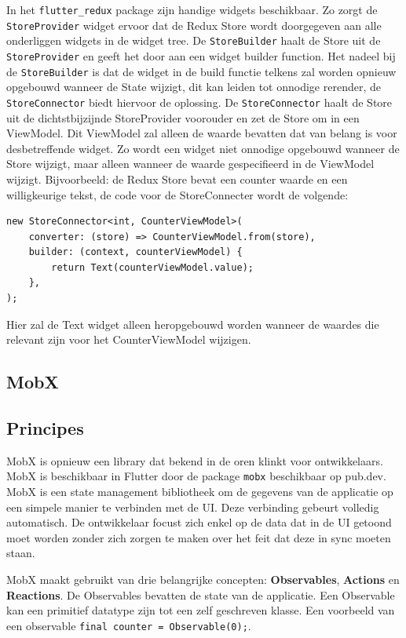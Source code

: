 In het \verb|flutter_redux| package zijn handige widgets beschikbaar. Zo zorgt de \verb|StoreProvider| widget ervoor dat de Redux Store wordt doorgegeven aan alle onderliggen widgets in de widget tree. De \verb|StoreBuilder| haalt de Store uit de \verb|StoreProvider| en geeft het door aan een widget builder function. Het nadeel bij de \verb|StoreBuilder| is dat de widget in de build functie telkens zal worden opnieuw opgebouwd wanneer de State wijzigt, dit kan leiden tot onnodige rerender, de \verb|StoreConnector| biedt hiervoor de oplossing. De \verb|StoreConnector| haalt de Store uit de dichtstbijzijnde StoreProvider voorouder en zet de Store om in een ViewModel. Dit ViewModel zal alleen de waarde bevatten dat van belang is voor desbetreffende widget. Zo wordt een widget niet onnodige opgebouwd wanneer de Store wijzigt, maar alleen wanneer de waarde gespecifieerd in de ViewModel wijzigt. Bijvoorbeeld: de Redux Store bevat een counter waarde en een willigkeurige tekst, de code voor de StoreConnecter wordt de volgende: 

\begin{verbatim}
new StoreConnector<int, CounterViewModel>(
    converter: (store) => CounterViewModel.from(store),
    builder: (context, counterViewModel) {
        return Text(counterViewModel.value);
    },
);
\end{verbatim}
Hier zal de Text widget alleen heropgebouwd worden wanneer de waardes die relevant zijn voor het CounterViewModel wijzigen.


\subsection{MobX}
\subsection*{Principes}
MobX is opnieuw een library dat bekend in de oren klinkt voor ontwikkelaars. MobX is beschikbaar in Flutter door de package \verb|mobx| beschikbaar op pub.dev. MobX is een state management bibliotheek om de gegevens van de applicatie op een simpele manier te verbinden met de UI. Deze verbinding gebeurt volledig automatisch. De ontwikkelaar focust zich enkel op de data dat in de UI getoond moet worden zonder zich zorgen te maken over het feit dat deze in sync moeten staan.

MobX maakt gebruikt van drie belangrijke concepten: \textbf{Observables}, \textbf{Actions} en \textbf{Reactions}.
De Observables bevatten de state van de applicatie. Een Observable kan een primitief datatype zijn tot een zelf geschreven klasse. Een voorbeeld van een observable \verb|final counter = Observable(0);|.

